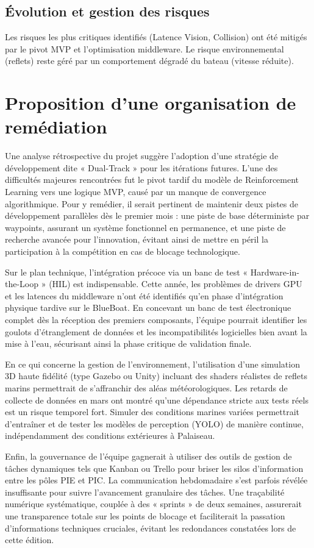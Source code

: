 \documentclass[11pt, a4paper]{article}
\begin{document}
\subsection{Évolution et gestion des risques}
Les risques les plus critiques identifiés (Latence Vision, Collision) ont été mitigés par le pivot MVP et l'optimisation middleware. Le risque environnemental (reflets) reste géré par un comportement dégradé du bateau (vitesse réduite).

\section{Proposition d'une organisation de remédiation}
Une analyse rétrospective du projet suggère l'adoption d'une stratégie de développement dite « Dual-Track » pour les itérations futures. L'une des difficultés majeures rencontrées fut le pivot tardif du modèle de Reinforcement Learning vers une logique MVP, causé par un manque de convergence algorithmique. Pour y remédier, il serait pertinent de maintenir deux pistes de développement parallèles dès le premier mois : une piste de base déterministe par waypoints, assurant un système fonctionnel en permanence, et une piste de recherche avancée pour l'innovation, évitant ainsi de mettre en péril la participation à la compétition en cas de blocage technologique.

Sur le plan technique, l'intégration précoce via un banc de test « Hardware-in-the-Loop » (HIL) est indispensable. Cette année, les problèmes de drivers GPU et les latences du middleware n'ont été identifiés qu'en phase d'intégration physique tardive sur le BlueBoat. En concevant un banc de test électronique complet dès la réception des premiers composants, l'équipe pourrait identifier les goulots d'étranglement de données et les incompatibilités logicielles bien avant la mise à l'eau, sécurisant ainsi la phase critique de validation finale.

En ce qui concerne la gestion de l'environnement, l'utilisation d'une simulation 3D haute fidélité (type Gazebo ou Unity) incluant des shaders réalistes de reflets marins permettrait de s'affranchir des aléas météorologiques. Les retards de collecte de données en mars ont montré qu'une dépendance stricte aux tests réels est un risque temporel fort. Simuler des conditions marines variées permettrait d'entraîner et de tester les modèles de perception (YOLO) de manière continue, indépendamment des conditions extérieures à Palaiseau.

Enfin, la gouvernance de l'équipe gagnerait à utiliser des outils de gestion de tâches dynamiques tels que Kanban ou Trello pour briser les silos d'information entre les pôles PIE et PIC. La communication hebdomadaire s'est parfois révélée insuffisante pour suivre l'avancement granulaire des tâches. Une traçabilité numérique systématique, couplée à des « sprints » de deux semaines, assurerait une transparence totale sur les points de blocage et faciliterait la passation d'informations techniques cruciales, évitant les redondances constatées lors de cette édition.
\end{document}
